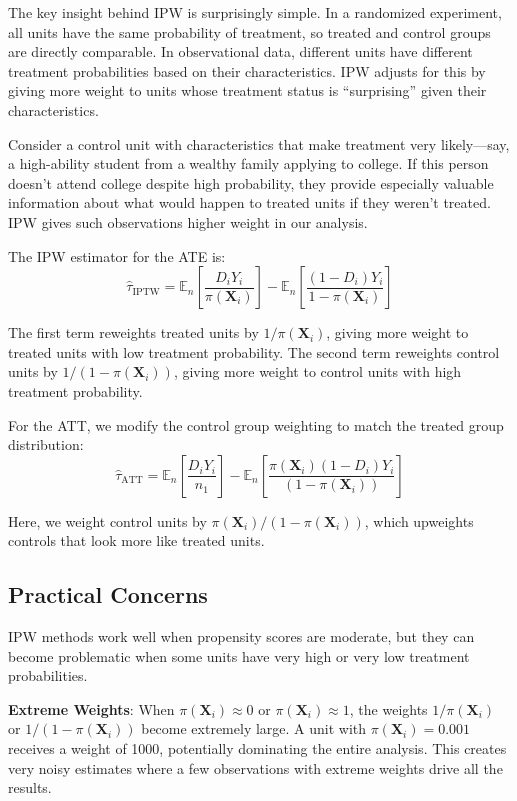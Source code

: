 \documentclass[12pt]{article}
\begin{document}
\begin{multicols}{2}
The key insight behind IPW is surprisingly simple.
In a randomized experiment, all units have the same probability of treatment, so treated and control groups are directly comparable.
In observational data, different units have different treatment probabilities based on their characteristics.
IPW adjusts for this by giving more weight to units whose treatment status is ``surprising'' given their characteristics.

Consider a control unit with characteristics that make treatment very likely---say, a high-ability student from a wealthy family applying to college.
If this person doesn't attend college despite high probability, they provide especially valuable information about what would happen to treated units if they weren't treated.
IPW gives such observations higher weight in our analysis.

The IPW estimator for the ATE is:
$$\hat{\tau}_{\text{IPTW}} = \mathbb{E}_n\left[\frac{D_i Y_i}{\pi(\bm{X}_i)}\right] - \mathbb{E}_n\left[\frac{(1-D_i)Y_i}{1-\pi(\bm{X}_i)}\right]$$

The first term reweights treated units by $1/\pi(\bm{X}_i)$, giving more weight to treated units with low treatment probability.
The second term reweights control units by $1/(1-\pi(\bm{X}_i))$, giving more weight to control units with high treatment probability.

For the ATT, we modify the control group weighting to match the treated group distribution:
$$\hat{\tau}_{\text{ATT}} = \mathbb{E}_n\left[\frac{D_i Y_i}{n_1}\right] - \mathbb{E}_n\left[\frac{\pi(\bm{X}_i)(1-D_i)Y_i}{(1-\pi(\bm{X}_i))}\right]$$

Here, we weight control units by $\pi(\bm{X}_i)/(1-\pi(\bm{X}_i))$, which upweights controls that look more like treated units.

\subsection*{Practical Concerns}

IPW methods work well when propensity scores are moderate, but they can become problematic when some units have very high or very low treatment probabilities.

\textbf{Extreme Weights}: When $\pi(\bm{X}_i) \approx 0$ or $\pi(\bm{X}_i) \approx 1$, the weights $1/\pi(\bm{X}_i)$ or $1/(1-\pi(\bm{X}_i))$ become extremely large.
A unit with $\pi(\bm{X}_i) = 0.001$ receives a weight of 1000, potentially dominating the entire analysis.
This creates very noisy estimates where a few observations with extreme weights drive all the results.


\end{multicols}
\end{document}
